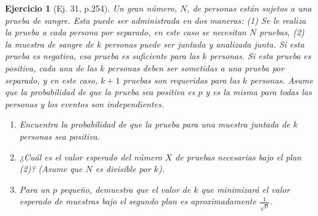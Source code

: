 \documentclass[12pt,letterpaper]{article}
\newtheorem{ej}{Ejercicio}
\begin{document}
\begin{ej}[Ej. 31, p.254] 
Un gran número, $N$, de personas están sujetos a una prueba de sangre. Esta puede ser administrada en dos maneras: (1) Se le realiza la prueba a cada persona por separado, en este caso se necesitan $N$ pruebas, (2) la muestra de sangre de $k$ personas puede ser juntada y analizada junta. Si esta prueba es negativa, esa prueba es suficiente para las $k$ personas. Si esta prueba es positiva, cada una de las $k$ personas deben ser sometidas a una prueba por separado, y en este caso, $k+1$ pruebas son requeridas para las $k$ personas. Asume que la probabilidad de que la prueba sea positiva es $p$ y es la misma para todas las personas y los eventos son independientes. 
\begin{enumerate}
\item[a)] Encuentra la probabilidad de que la prueba para una muestra juntada de $k$ personas sea positiva. 
\item[b)] ¿Cuál es el valor esperado del número $X$ de pruebas necesarias bajo el plan (2)? (Asume que $N$ es divisible por $k$).
\item[c)] Para un $p$ pequeño, demuestra que el valor de $k$ que minimizará el valor esperado de muestras bajo el segundo plan es aproximadamente $\frac{1}{\sqrt{p}}$.
\end{enumerate}
\end{ej}
\end{document}
